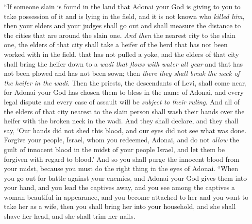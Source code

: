 \begin{biblechapter} %
\verse “If someone slain is found in the land that Adonai your God is giving to you to take possession of it and is lying in the field, and it is not known who \textit{killed him},
\verse then your elders and your judges shall go out and shall measure the distance to the cities that are around the slain one.
\verse \textit{And then} the nearest city to the slain one, the elders of that city shall take a heifer of the herd that has not been worked with in the field, that has not pulled a yoke,
\verse and the elders of that city shall bring the heifer down to a \textit{wadi that flows with water all year} and that has not been plowed and has not been sown; then \textit{there they shall break the neck of the heifer in the wadi}.
\verse Then the priests, the descendants of Levi, shall come near, for Adonai your God has chosen them to bless in the name of Adonai, and every legal dispute and every case of assault will be \textit{subject to their ruling}.
\verse And all of the elders of that city nearest to the slain person shall wash their hands over the heifer with the broken neck in the wadi.
\verse And they shall declare, and they shall say, ‘Our hands did not shed this blood, and our eyes did not see what was done.
\verse Forgive your people, Israel, whom you redeemed, Adonai, and do not \textit{allow} the guilt of innocent blood in the midst of your people Israel, and let them be forgiven with regard to blood.’
\verse And so you shall purge the innocent blood from your midst, because you must do the right thing in the eyes of Adonai.
\verse “When you go out for battle against your enemies, and Adonai your God gives them into your hand, and you lead the captives away,
\verse and you see among the captives a woman beautiful in appearance, and you become attached to her and you want to take her as a wife,
\verse then you shall bring her into your household, and she shall shave her head, and she shall trim her nails.

\end{biblechapter}
